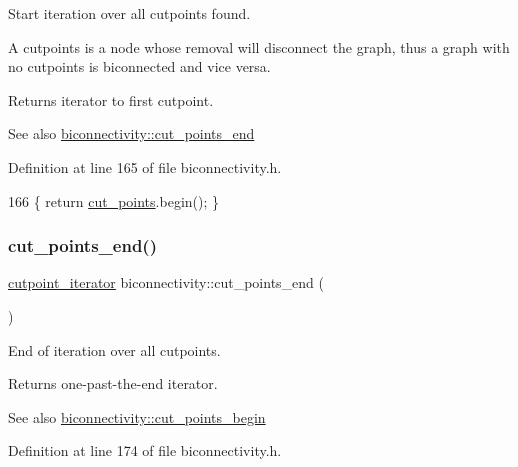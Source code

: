 Start iteration over all cutpoints found. 

A cutpoints is a node whose removal will disconnect the graph, thus a graph with no cutpoints is biconnected and vice versa.

\begin{DoxyReturn}{Returns}
iterator to first cutpoint. 
\end{DoxyReturn}
\begin{DoxySeeAlso}{See also}
\mbox{\hyperlink{classbiconnectivity_a78cb06c1d056b9519622a67a92e85b6e}{biconnectivity\+::cut\+\_\+points\+\_\+end}} 
\end{DoxySeeAlso}


Definition at line 165 of file biconnectivity.\+h.


\begin{DoxyCode}
166     \{ \textcolor{keywordflow}{return} \mbox{\hyperlink{classbiconnectivity_a776f4f2d5654ef6836aeb34690fdadc5}{cut\_points}}.begin(); \}
\end{DoxyCode}
\mbox{\label{classbiconnectivity_a78cb06c1d056b9519622a67a92e85b6e}} 
\subsubsection{\texorpdfstring{cut\+\_\+points\+\_\+end()}{cut\_points\_end()}}
{\footnotesize\ttfamily \mbox{\hyperlink{classbiconnectivity_ac9063160d59ab0ea4fa924a68395700b}{cutpoint\+\_\+iterator}} biconnectivity\+::cut\+\_\+points\+\_\+end (\begin{DoxyParamCaption}{ }\end{DoxyParamCaption})\hspace{0.3cm}{\ttfamily [inline]}}



End of iteration over all cutpoints. 

\begin{DoxyReturn}{Returns}
one-\/past-\/the-\/end iterator. 
\end{DoxyReturn}
\begin{DoxySeeAlso}{See also}
\mbox{\hyperlink{classbiconnectivity_a473197552874aaf148e847838144eed7}{biconnectivity\+::cut\+\_\+points\+\_\+begin}} 
\end{DoxySeeAlso}


Definition at line 174 of file biconnectivity.\+h.


